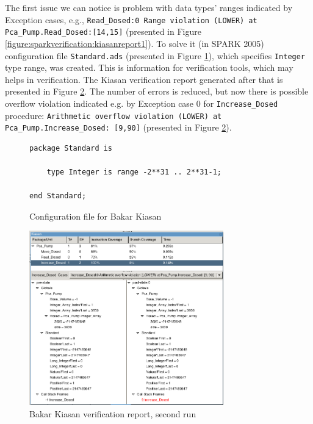 The first issue we can notice is problem with data types' ranges indicated by Exception cases, e.g., \lstinline{Read_Dosed:0 Range violation (LOWER) at Pca_Pump.Read_Dosed:[14,15]} (presented in Figure \ref{figure:sparkverification:kiasanreport1}). To solve it (in SPARK 2005) configuration file \lstinline{Standard.ads} (presented in Figure \ref{figure:sparkverification:config}), which specifies \lstinline{Integer} type range, was created. This is information for verification tools, which may helps in verification. The Kiasan verification report generated after that is presented in Figure \ref{figure:sparkverification:kiasanreport2}. The number of errors is reduced, but now there is possible overflow violation indicated e.g. by Exception case 0 for \lstinline{Increase_Dosed} procedure: \lstinline{Arithmetic overflow violation (LOWER) at Pca_Pump.Increase_Dosed: [9,90]} (presented in Figure \ref{figure:sparkverification:kiasanreport2}).

\begin{figure}
\singlespacing
\begin{lstlisting}[frame=single, gobble=0]
package Standard is

    type Integer is range -2**31 .. 2**31-1;

end Standard;
\end{lstlisting}
\doublespacing
\caption{Configuration file for Bakar Kiasan}
\label{figure:sparkverification:config}
\end{figure}

\begin{figure}[ht]%
    \begin{center}
        \includegraphics[width=0.75\textwidth]{figures/pca-pump-verification-step2.png}        
    \end{center}
    \caption{Bakar Kiasan verification report, second run}
    \label{figure:sparkverification:kiasanreport2}
\end{figure}

